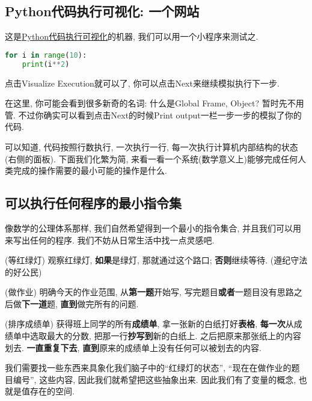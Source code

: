 \subsection{Python代码执行可视化: 一个网站}

\begin{tool}
这是\href{https://pythontutor.com/visualize.html\#mode=display}{Python代码执行可视化}的机器,
我们可以用一个小程序来测试之.
\begin{lstlisting}[language=python]
for i in range(10):
    print(i**2)
\end{lstlisting}

点击Visualize Execution就可以了, 你可以点击Next来继续模拟执行下一步.

在这里, 你可能会看到很多新奇的名词: 什么是Global Frame, Object? 暂时先不用管. 不过你确实可以看到点击Next的时候Print output一栏一步一步的模拟了你的代码. 
\end{tool}

可以知道, 代码按照行数执行, 一次执行一行, 每一次执行计算机内部结构的状态(右侧的面板). 下面我们化繁为简, 来看一看一个系统(数学意义上)能够完成任何人类完成的操作需要的最小可能的操作是什么. 

\subsection{可以执行任何程序的最小指令集}
像数学的公理体系那样, 我们自然希望得到一个最小的指令集合, 并且我们可以用来写出任何的程序. 我们不妨从日常生活中找一点灵感吧.
\begin{example}
(等红绿灯) 观察红绿灯, \textbf{如果}是绿灯, 那就通过这个路口; \textbf{否则}继续等待. (遵纪守法的好公民)

(做作业) 明确今天的作业范围, 从\textbf{第一题}开始写, 写完题目\textbf{或者}一题目没有思路之后做\textbf{下一道}题,
\textbf{直到}做完所有的问题.

(排序成绩单) 获得班上同学的所有\textbf{成绩单}, 拿一张新的白纸打好\textbf{表格}, \textbf{每一次}从成绩单中选取最大的分数,
把那一行\textbf{抄写到}新的白纸上. 之后把原来那张纸上的内容划去. \textbf{一直重复下去}, \textbf{直到}原来的成绩单上没有任何可以被划去的内容.
\end{example}
我们需要找一些东西来具象化我们脑子中的``红绿灯的状态'', ``现在在做作业的题目编号'', 这些内容, 因此我们就希望把这些抽象出来.
因此我们有了变量的概念, 也就是值存在的空间. 


